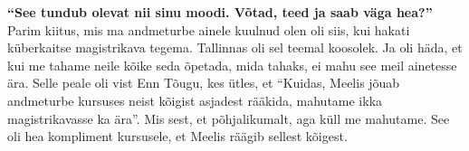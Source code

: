 \textbf{\enquote{See tundub olevat nii sinu moodi. Võtad, teed ja saab väga hea?}}
Parim kiitus, mis ma andmeturbe ainele kuulnud olen oli siis, kui hakati küberkaitse magistrikava tegema. Tallinnas oli sel teemal koosolek. Ja oli häda, et kui me tahame neile kõike seda õpetada, mida tahaks, ei mahu see meil ainetesse ära. Selle peale oli vist Enn Tõugu, kes ütles, et \enquote{Kuidas, Meelis jõuab andmeturbe kursuses neist kõigist asjadest rääkida, mahutame ikka magistrikavasse ka ära}. Mis sest, et põhjalikumalt, aga küll me mahutame. See oli hea kompliment kursusele, et Meelis räägib sellest kõigest. 


